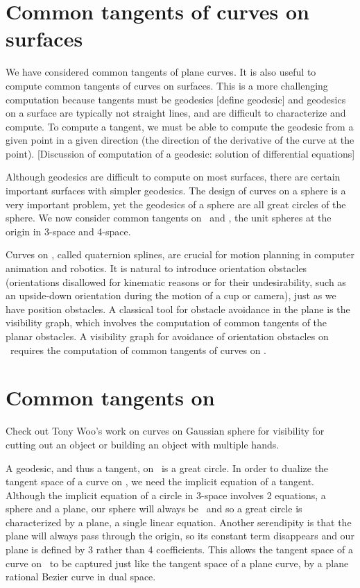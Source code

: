\section{Common tangents of curves on surfaces}

We have considered common tangents of plane curves.
It is also useful to compute common tangents of curves on surfaces.
This is a more challenging computation 
because tangents must be geodesics [define geodesic] and 
geodesics on a surface are typically not straight lines, and are difficult
to characterize and compute.
To compute a tangent, we must be able to compute the geodesic
from a given point in a given direction (the direction of the derivative
of the curve at the point).
[Discussion of computation of a geodesic: solution of differential equations]

Although geodesics are difficult to compute on most surfaces,
there are certain important surfaces with simpler geodesics.
The design of curves on a sphere is a very important problem,
yet the geodesics of a sphere are all great circles of the sphere.
We now consider common tangents on \ and , the unit spheres 
at the origin in 3-space and 4-space.

Curves on , called quaternion splines, are crucial for motion planning
in computer animation and robotics.
It is natural to introduce orientation obstacles (orientations disallowed for
kinematic reasons or for their undesirability, such as an upside-down 
orientation during the motion of a cup or camera), just as we have position
obstacles.
A classical tool for obstacle avoidance in the plane is the visibility graph,
which involves the computation of common tangents of the planar obstacles.
A visibility graph for avoidance of orientation obstacles on \
requires the computation of common tangents of curves on .

\section{Common tangents on }

Check out Tony Woo's work on curves on Gaussian sphere for
visibility for cutting out an object or building an object with multiple
hands.

A geodesic, and thus a tangent, on \ is a great circle.
In order to dualize the tangent space of a curve on \Sn{2},
we need the implicit equation of a tangent.
Although the implicit equation of a circle in 3-space involves 2 equations,
a sphere and a plane, our sphere will always be \Sn{2}\ and so 
a great circle is characterized by a plane, a single linear equation.
Another serendipity is that the plane will always pass through the origin,
so its constant term disappears and our plane is defined by 3 rather than
4 coefficients.
This allows the tangent space of a curve on \ to be captured just 
like the tangent space of a plane curve, by a plane rational Bezier curve 
in dual space.

